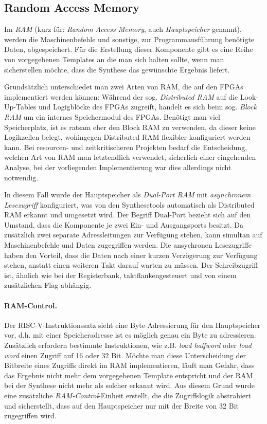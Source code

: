 \subsection{Random Access Memory}

Im \textit{RAM} (kurz für: \textit{Random Access Memory}, auch \textit{Hauptspeicher} genannt), werden die Maschinenbefehle und sonstige, zur Programmausführung benötigte Daten, abgespeichert.
Für die Erstellung dieser Komponente gibt es eine Reihe von vorgegebenen Templates an die man sich halten sollte, wenn man sicherstellen möchte, dass die Synthese das gewünschte Ergebnis liefert.~\cite[S. 243 ff.]{Chu}

Grundsätzlich unterschiedet man zwei Arten von RAM, die auf den FPGAs implementiert werden können:
Während der sog. \textit{Distributed RAM} auf die Look-Up-Tables und Logigblöcke des FPGAs zugreift, handelt es sich beim sog. \textit{Block RAM} um ein internes Speichermodul des FPGAs.
Benötigt man viel Speicherplatz, ist es ratsam eher den Block RAM zu verwenden, da dieser keine Logikzellen belegt, wohingegen Distributed RAM flexibler konfiguriert werden kann.
Bei resourcen- und zeitkritischeren Projekten bedarf die Entscheidung, welchen Art von RAM man letztendlich verwendet, sicherlich einer eingehenden Analyse, bei der vorliegenden Implementierung war dies allerdings nicht notwendig.


In diesem Fall wurde der Hauptspeicher als \textit{Dual-Port RAM} mit \textit{asynchronem Lesezugriff} konfiguriert, was von den Synthesetools automatisch als Distributed RAM erkannt und umgesetzt wird.
Der Begriff Dual-Port bezieht sich auf den Umstand, dass die Komponente je zwei Ein- und Ausgangsports besitzt.
Da zusätzlich zwei separate Adressleitungen zur Verfügung stehen, kann simultan auf Maschinenbefehle und Daten zugegriffen werden.
Die ansychronen Lesezugriffe haben den Vorteil, dass die Daten nach einer kurzen Verzögerung zur Verfügung stehen, anstatt einen weiteren Takt darauf warten zu müssen.
Der Schreibzugriff ist, ähnlich wie bei der Registerbank, taktflankengesteuert und von einem zusätzlichen Flag abhängig.

\paragraph{RAM-Control.} Der RISC-V-Instruktionssatz sieht eine Byte-Adressierung für den Hauptspeicher vor, d.h. mit einer Speicheradresse ist es möglich genau ein Byte zu adressieren.
Zusätzlich erfordern bestimmte Instruktionen, wie z.B. \textit{load halfword} oder \textit{load word} einen Zugriff auf 16 oder 32 Bit.
Möchte man diese Unterscheidung der Bitbreite eines Zugriffs direkt im RAM implementieren, läuft man Gefahr, dass das Ergebnis nicht mehr dem vorgegebenen Template entspricht und der RAM bei der Synthese nicht mehr als solcher erkannt wird.
Aus diesem Grund wurde eine zusätzliche \textit{RAM-Control}-Einheit erstellt, die die Zugriffslogik abstrahiert und sicherstellt, dass auf den Hauptspeicher nur mit der Breite von 32 Bit zugegriffen wird.

